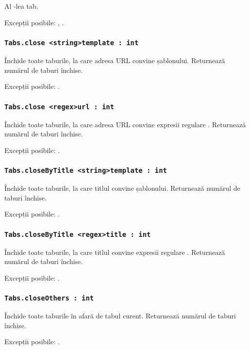 Al -lea tab.

Excepții posibile: , .

\subsubsection{\lstinline|Tabs.close <string>template : int|}

Închide toate taburile, la care adresa URL convine șablonului. Returnează numărul de taburi închise.

Excepții posibile: .

\subsubsection{\lstinline|Tabs.close <regex>url : int|}

Închide toate taburile, la care adresa URL convine expresii regulare . Returnează numărul de taburi închise.

Excepții posibile: .

\subsubsection{\lstinline|Tabs.closeByTitle <string>template : int|}

Închide toate taburile, la care titlul convine șablonului. Returnează numărul de taburi închise.

Excepții posibile: .

\subsubsection{\lstinline|Tabs.closeByTitle <regex>title : int|}

Închide toate taburile, la care titlul convine expresii regulare . Returnează numărul de taburi închise.

Excepții posibile: .

\subsubsection{\lstinline|Tabs.closeOthers : int|}

Închide toate taburile în afară de tabul curent. Returnează numărul de taburi închise.

Excepții posibile: .

